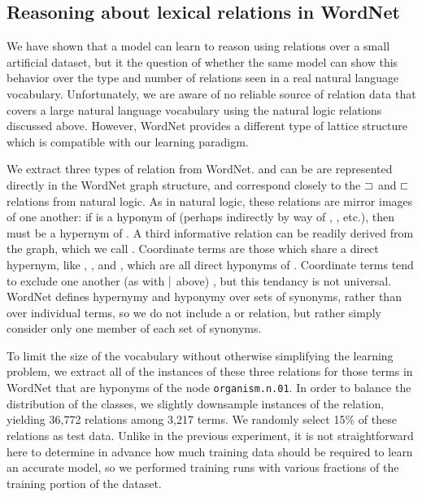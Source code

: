 \subsection*{Reasoning about lexical relations in WordNet}\label{sec:wordnet}

We have shown that a model can learn to reason using relations over a small artificial dataset, 
but it the question of whether the same model can show this behavior over the type and number of
relations seen in a real natural language vocabulary.
Unfortunately, we are aware of no reliable source of relation data that covers a large natural 
language vocabulary using the natural logic relations discussed above. However, WordNet 
\cite{fellbaum2010wordnet} provides a different type of lattice structure which is compatible with
our learning paradigm.

We extract three types of relation from WordNet.  and  can be are represented
directly in the WordNet graph structure, and correspond closely to the $\sqsupset$ and $\sqsubset$ relations from
natural logic. As in natural logic, these relations are mirror images of one another: if  is a
hyponym of  (perhaps indirectly by way of , , etc.), then  must be a 
hypernym of . A third informative relation can 
be readily derived from the graph, which we call . Coordinate terms are those which share
a direct hypernym, like , , and , which are all direct hyponyms of . 
Coordinate terms tend to exclude one another (as with $\mathbin{|}$ above) \cite{Hurford:1974}, but this tendancy
is not universal. WordNet defines hypernymy and hyponymy over sets of synonyms, rather than over individual 
terms, so we do not include a  or  relation, but rather simply consider only one
member of each set of synonyms.

To limit the size of the vocabulary without otherwise simplifying the learning problem, we extract all of the
instances of these three relations for those terms in WordNet that are hyponyms of the node \texttt{organism.n.01}.
In order to balance the distribution of the classes, we slightly downsample instances of the  relation,
yielding 36,772 relations among 3,217 terms. We randomly select 15\% of these relations as test data. Unlike in the
previous experiment, it is not straightforward here to determine in advance how much training data should be required
to learn an accurate model, so we performed training runs with various fractions of the training portion of the 
dataset. 

